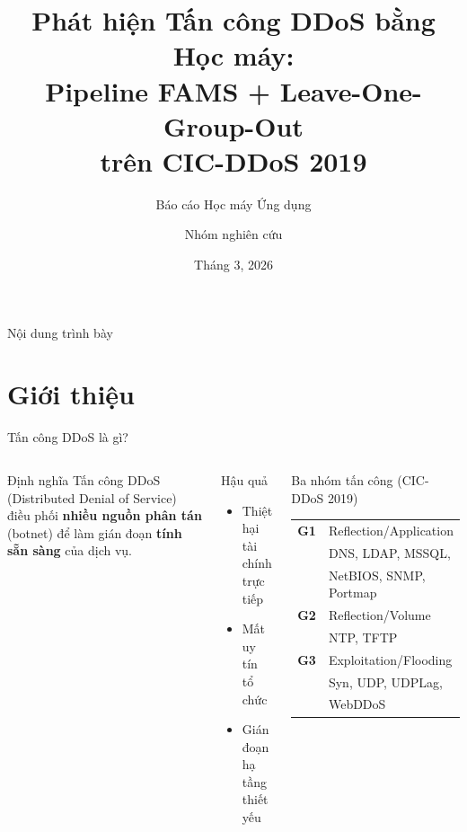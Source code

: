 \documentclass[aspectratio=169,12pt]{beamer}
\title[Phát hiện DDoS bằng ML]{%
  Phát hiện Tấn công DDoS bằng Học máy:\\
  Pipeline FAMS + Leave-One-Group-Out\\
  trên CIC-DDoS 2019}
\subtitle{Báo cáo Học máy Ứng dụng}
\author{Nhóm nghiên cứu}
\institute{Học viện Kỹ thuật}
\date{Tháng 3, 2026}
\begin{document}

\begin{frame}
  \titlepage
\end{frame}

\begin{frame}{Nội dung trình bày}
  \tableofcontents[hideallsubsections]
\end{frame}

\section{Giới thiệu}

\begin{frame}{Tấn công DDoS là gì?}
  \begin{columns}[T]
      \begin{block}{Định nghĩa}
        Tấn công DDoS (Distributed Denial of Service) điều phối
        \textbf{nhiều nguồn phân tán} (botnet) để làm gián đoạn
        \textbf{tính sẵn sàng} của dịch vụ.
      \end{block}
      \vspace{0.3em}
      \begin{alertblock}{Hậu quả}
        \begin{itemize}
          \item Thiệt hại tài chính trực tiếp
          \item Mất uy tín tổ chức
          \item Gián đoạn hạ tầng thiết yếu
        \end{itemize}
      \end{alertblock}
      \begin{block}{Ba nhóm tấn công (CIC-DDoS 2019)}
        \small
        \begin{tabular}{lp{3.5cm}}
          \textbf{G1} & Reflection/Application\\
                      & DNS, LDAP, MSSQL,\\
                      & NetBIOS, SNMP, Portmap\\[4pt]
          \textbf{G2} & Reflection/Volume\\
                      & NTP, TFTP\\[4pt]
          \textbf{G3} & Exploitation/Flooding\\
                      & Syn, UDP, UDPLag,\\
                      & WebDDoS\\
        \end{tabular}
      \end{block}
  \end{columns}
\end{frame}
\end{document}
